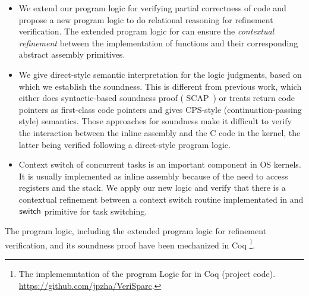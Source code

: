 \begin{itemize}
    \item
    We extend our program logic for verifying 
    partial correctness of \sparc{} code and 
    propose a new program logic to 
    do relational reasoning for refinement verification. 
    The extended program logic for \sparc{} can ensure 
    the {\it contextual refinement} between 
    the implementation of 
    \sparc{} functions and their corresponding 
    abstract assembly primitives. 

    \item
    We give direct-style semantic interpretation for
    the logic judgments, based on which we establish the
    soundness. This is different from previous
    work, which either does syntactic-based soundness proof
    (\eg{} SCAP~\cite{Feng06pldi}) or treats return code pointers
    as first-class code pointers and gives CPS-style 
    (continuation-passing style) semantics.
    Those approaches for soundness make it difficult to verify
    the interaction between the inline assembly and the C
    code in the kernel, the latter being verified following
    a direct-style program logic.

    \item
	Context switch of concurrent tasks is an important
    component in OS kernels. It is usually implemented
    as inline assembly because of the need to access
    registers and the stack. 
    We apply our new logic and 
    verify that there is a contextual refinement 
    between a context switch routine implementated 
    in \sparc{} and $\mathsf{switch}$ primitive for task 
    switching. 


\end{itemize}
The program logic, including the extended program logic 
for refinement verification, and its soundness proof 
have been mechanized in Coq
\footnote{The implememntation of the program Logic for 
\sparc{} in {Coq} (project code). 
\url{https://github.com/jpzha/VeriSparc}.}. 

